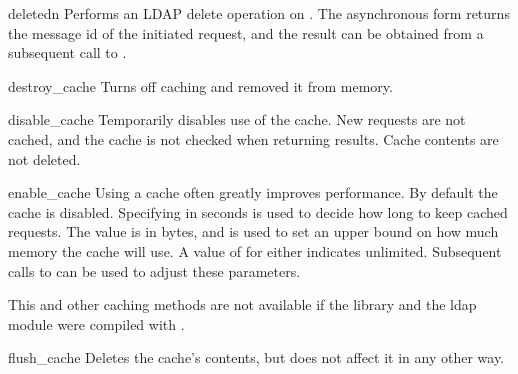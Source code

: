 
\begin{methoddesc}[int]{delete}{dn}
Performs an LDAP delete operation on . The asynchronous form
returns the message id of the initiated request, and the result can be obtained
from a subsequent call to .
\end{methoddesc}


\begin{methoddesc}{destroy_cache}{}
Turns off caching and removed it from memory.
\end{methoddesc}


\begin{methoddesc}{disable_cache}{}
Temporarily disables use of the cache. New requests are not cached, and
the cache is not checked when returning results. Cache contents are not
deleted.
\end{methoddesc}


\begin{methoddesc}{enable_cache}{}
Using a cache often greatly improves performance. By default the cache
is disabled. Specifying  in seconds is used to decide how long
to keep cached requests. The  value is in bytes, and is used
to set an upper bound on how much memory the cache will use. A value of
 for either indicates unlimited. 
Subsequent calls to
 can be used to adjust these parameters.

This and other caching methods are not available if the library and the 
ldap module were compiled with .
\end{methoddesc}


\begin{methoddesc}{flush_cache}{}
Deletes the cache's contents, but does not affect it in any other way.
\end{methoddesc}

